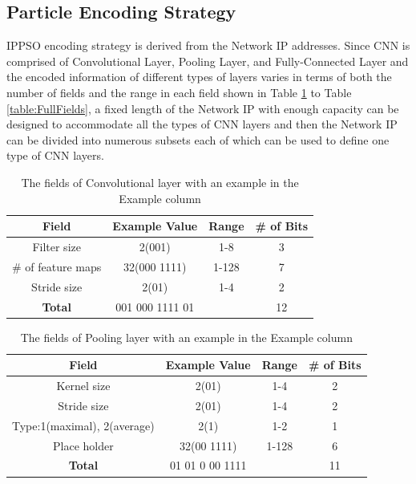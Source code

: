 \documentclass[conference]{IEEEtran}
\begin{document}
\subsection{Particle Encoding Strategy}\label{sec:ParticleEncodingStrategy}
IPPSO encoding strategy is derived from the Network IP addresses. Since CNN is comprised of Convolutional Layer, Pooling Layer, and Fully-Connected Layer and the encoded information of different types of layers varies in terms of both the number of fields and the range in each field shown in Table \ref{table:ConvFields} to Table \ref{table:FullFields}, a fixed length of the Network IP with enough capacity can be designed to accommodate all the types of CNN layers and then the Network IP can be divided into numerous subsets each of which can be used to define one type of CNN layers. 

\begin{table}[!t]
	\renewcommand{\arraystretch}{1.3}
	\caption{The fields of Convolutional layer with an example in the Example column}
	\label{table:ConvFields}
	\centering
	\begin{tabular}{|c|c|c|c|}
		\hline
		Field & Example Value & Range & \# of Bits\\
		\hline
		Filter size & 2(001) & 1-8 & 3\\
		\hline
		\# of feature maps & 32(000 1111) & 1-128 & 7\\
		\hline
		Stride size & 2(01) & 1-4 & 2\\
		\hline
		\textbf{Total} & 001 000 1111 01 &  & 12\\
		\hline
	\end{tabular}
\end{table}


\begin{table}[!t]
	\renewcommand{\arraystretch}{1.3}
	\caption{The fields of Pooling layer with an example in the Example column}
	\label{table:PoolingFields}
	\centering
	\begin{tabular}{|c|c|c|c|}
		\hline
		Field & Example Value & Range & \# of Bits\\
		\hline
		Kernel size & 2(01) & 1-4 & 2\\
		\hline
		Stride size & 2(01) & 1-4 & 2\\
		\hline
		Type:1(maximal), 2(average) & 2(1) & 1-2 & 1\\
		\hline
		Place holder & 32(00 1111) & 1-128 & 6\\
		\hline
		\textbf{Total} & 01 01 0 00 1111 &  & 11\\
		\hline
	\end{tabular}
\end{table}
\end{document}

